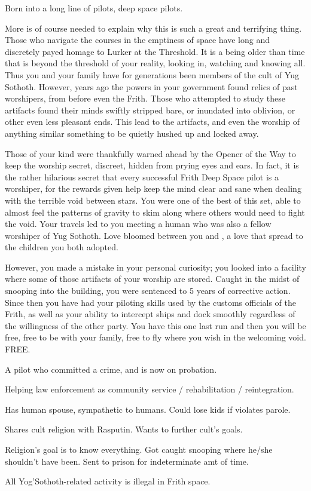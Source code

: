 \documentclass[char]{guildcamp4}
\begin{document}
\name{\cPilot{}}

Born into a long line of pilots, deep space pilots. 

More is of course needed to explain why this is such a great and terrifying thing.
Those who navigate the courses in the emptiness of space have long and discretely payed homage to Lurker at the Threshold. It is a being older than time that is beyond the threshold of your reality, looking in, watching and knowing all. Thus you and your family have for generations been members of the cult of Yug Sothoth. However, years ago the powers in your government found relics of past worshipers, from before even the Frith. Those who attempted to study these artifacts found their minds swiftly stripped bare, or inundated into oblivion, or other even less pleasant ends. This lead to the artifacts, and even the worship of anything similar something to be quietly hushed up and locked away. 

Those of your kind were thankfully warned ahead by the Opener of the Way to keep the worship secret, discreet, hidden from prying eyes and ears. 
In fact, it is the rather hilarious secret that every successful Frith Deep Space pilot is a worshiper, for the rewards given help keep the mind clear and sane when dealing with the terrible void between stars. You were one of the best of this set, able to almost feel the patterns of gravity to skim along where others would need to fight the void. Your travels led to you meeting a human who was also a fellow worshiper of Yug Sothoth.  Love bloomed between you and \cAlice{}, a love that spread to the children you both adopted. 

However, you made a mistake in your personal curiosity; you looked into a facility where some of those artifacts of your worship are stored. Caught in the midst of snooping into the building, you were sentenced to 5 years of corrective action. Since then you have had your piloting skills used by the customs officials of the Frith, as well as your ability to intercept ships and dock smoothly regardless of the willingness of the other party. 
You have this one last run and then you will be free, free to be with your family, free to fly where you wish in the welcoming void. FREE. 


\begin{itemz}[Backstory]
    \item A pilot who committed a crime, and is now on probation.
    \item Helping law enforcement as community service / rehabilitation / reintegration.
    \item Has human spouse, sympathetic to humans. Could lose kids if violates parole.
    \item Shares cult religion with Rasputin. Wants to further cult's goals.
    \item Religion's goal is to know everything. Got caught snooping where he/she shouldn't have been. Sent to prison for indeterminate amt of time.
    \item All Yog'Sothoth-related activity is illegal in Frith space.
\end{itemz}
\end{document}
